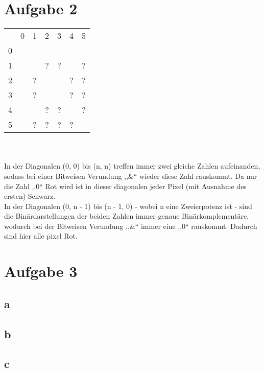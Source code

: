 \documentclass[10pt,a4paper]{article}
\begin{document}
\section{Aufgabe 2}
 \begin{tabular}{ccccccc}
    & 0 & 1 & 2 & 3 & 4 & 5\\
  0 & \cellcolor{red} & \cellcolor{red} & \cellcolor{red} & \cellcolor{red} & \cellcolor{red} & \cellcolor{red}\\
  1 & \cellcolor{red} & \cellcolor{black} & ? & ? & \cellcolor{red} & ?\\
  2 & \cellcolor{red} & ? & \cellcolor{black} & \cellcolor{red} & ? & ?\\
  3 & \cellcolor{red} & ? & \cellcolor{red} & \cellcolor{black} & ? & ?\\
  4 & \cellcolor{red} & \cellcolor{red} & ? & ? & \cellcolor{black} & ?\\
  5 & \cellcolor{red} & ? & ? & ? & ? & \cellcolor{black}\\
 \end{tabular}
 \\
 \\
In der Diagonalen (0, 0) bis (n, n) treffen immer zwei gleiche Zahlen aufeinanden, sodass bei einer Bitweisen Verundung ,,\&`` wieder diese Zahl rauskommt. Da nur die Zahl ,,0`` Rot wird ist in dieser diagonalen jeder Pixel (mit Ausnahme des ersten) Schwarz.
\\
In der Diagonalen (0, n - 1) bis (n - 1, 0) - wobei n eine Zweierpotenz ist - sind die Binärdarstellungen der beiden Zahlen immer genaue Binärkomplementäre, wodurch bei der Bitweisen Verundung ,,\&`` immer eine ,,0`` rauskommt. Dadurch sind hier alle pixel Rot.

\section{Aufgabe 3}
\subsection*{a}
\subsection*{b}
\subsection*{c}
\end{document}
